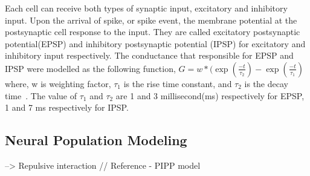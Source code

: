 %
%
%
%

Each cell can receive both types of synaptic input, excitatory  and inhibitory input. Upon the arrival of spike, or spike event, the membrane potential at the postsynaptic cell response to the input. They are called excitatory postsynaptic potential(EPSP) and inhibitory postsynaptic potential (IPSP) for excitatory and inhibitory input respectively. 
The conductance that responsible for EPSP and IPSP were modelled as the following function,
$G = w*(\exp(\frac{-t}{\tau_2} ) - \exp(\frac{-t}{\tau_1})$
where, w is weighting factor, $\tau_1$ is the rise time constant, and $\tau_2$ is the decay time~\cite {carnevale2006neuron}.
The value of $\tau_1$ and $\tau_2$  are 1 and 3 millisecond(ms) respectively for EPSP, 1 and 7 ms respectively for IPSP.



%
%
%
%
%
%

\subsection{Neural Population Modeling}
 --> Repulsive interaction  // Reference - PIPP model 


